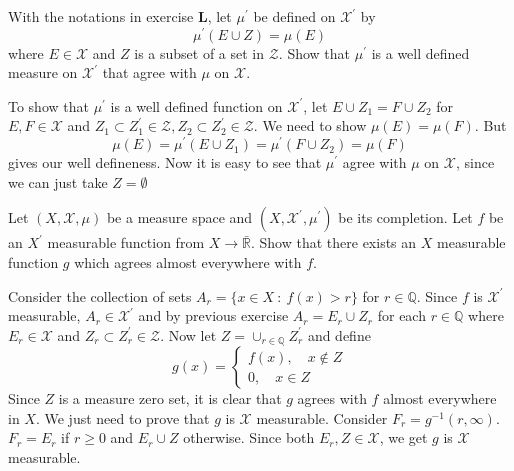\begin{exercise}[M]
	With the notations in exercise \textbf{L}, let $\mu^\prime$ be defined on $\mathcal{X}^\prime$ by $$\mu^\prime(E \cup Z) = \mu(E)$$
	where $E \in \mathcal{X}$ and $Z$ is a subset of a set in $\mathcal{Z}$. Show that $\mu^\prime$ is a well defined measure on $\mathcal{X}^\prime$ that agree with $\mu$ on $\mathcal{X}$.
\end{exercise}
\begin{solution}
	To show that $\mu^\prime$ is a well defined function on $\mathcal{X}^\prime$, let $E\cup Z_1 = F \cup Z_2$ for $E, F \in \mathcal{X}$ and $Z_1 \subset Z_1^\prime \in \mathcal{Z}, Z_2 \subset Z_2^\prime \in \mathcal{Z}$. We need to show $\mu(E) = \mu(F)$. But
	$$\mu(E) = \mu^\prime(E \cup Z_1) = \mu^\prime(F \cup Z_2) = \mu(F)$$
	gives our well defineness.
	Now it is easy to see that $ \mu^\prime$ agree with $\mu$ on $\mathcal{X}$, since we can just take $Z = \emptyset$
\end{solution}

\begin{exercise}[N]
	Let $(X, \mathcal{X}, \mu)$ be a measure space and $(X, \mathcal{X}^\prime, \mu^\prime)$ be its completion. Let $f$ be an $X^\prime$ measurable function from $X \to \bar{\mathbb{R}}$. Show that there exists an $X$ measurable function $g$ which agrees almost everywhere with $f$.
\end{exercise}
\begin{solution}
	Consider the collection of sets $A_r = \{ x \in X \ : \ f(x) > r \}$ for $r \in \mathbb{Q}$. Since $f$ is $\mathcal{X}^\prime$ measurable, $A_r \in \mathcal{X}^\prime$ and by previous exercise $A_r = E_r \cup Z_r$ for each $r \in \mathbb{Q}$ where $E_r \in \mathcal{X}$ and $Z_r \subset Z_r^\prime \in \mathcal{Z}$. Now let $Z = \cup_{r \in \mathbb{Q}} Z_r^\prime$ and define
	\begin{equation}
		g(x) = \begin{cases}
			f(x), \quad x \not \in Z \\
			0, \quad x \in Z
		\end{cases}
	\end{equation}
	Since $Z$ is a measure zero set, it is clear that $g$ agrees with $f$ almost everywhere in $X$. We just need to prove that $g$ is $\mathcal{X}$ measurable. Consider $F_r = g^{-1}(r, \infty)$. $ F_r = E_r$ if $r \ge 0$ and $E_r \cup Z$ otherwise. Since both $E_r, Z \in \mathcal{X}$, we get $g$ is $\mathcal{X}$ measurable.
\end{solution}

